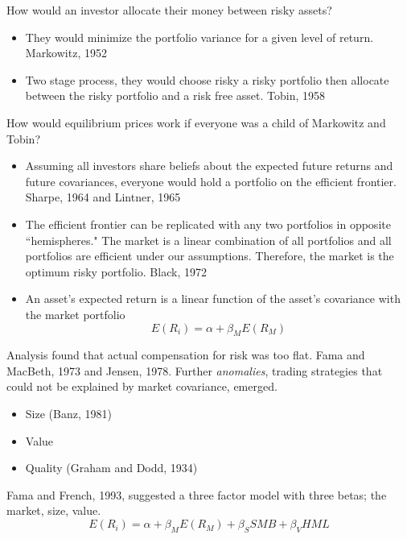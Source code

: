 How would an investor allocate their money between risky assets?
\begin{itemize}
  \item They would minimize the portfolio variance for a given level of return.
  Markowitz, 1952\cite{markowitz1952portfolio}
  \item Two stage process, they would choose risky a risky portfolio then allocate between
  the risky portfolio and a risk free asset. Tobin, 1958\cite{tobin1958liquidity}
\end{itemize}
How would equilibrium prices work if everyone was a child of Markowitz and Tobin?
\begin{itemize}
  \item Assuming all investors share beliefs about the expected future returns and future
  covariances, everyone would hold a portfolio on the efficient frontier.
  Sharpe, 1964\cite{sharpe1964capital} and Lintner, 1965\cite{lintner1965valuation}
  \item The efficient frontier can be replicated with any two portfolios in opposite
  ``hemispheres." The market is a linear combination of all portfolios and all
  portfolios are efficient under our assumptions. Therefore, the market is the optimum
  risky portfolio. Black, 1972\cite{black1972capital}
  \item An asset's expected return is a linear function of the asset's covariance with the
  market portfolio
  \begin{equation}
    E(R_i) = \alpha + \beta_M E(R_M)
  \end{equation}
\end{itemize}

Analysis found that actual compensation for risk was too flat.
Fama and MacBeth, 1973\cite{fama1973risk} and Jensen, 1978\cite{jensen1978some}.
Further \emph{anomalies}, trading strategies that could not be explained by market
covariance, emerged.
\begin{itemize}
  \item Size (Banz, 1981\cite{banz1981relationship})
  \item Value
  \item Quality (Graham and Dodd, 1934\cite{graham1934security})
\end{itemize}

Fama and French, 1993\cite{fama1993common}, suggested a three factor model with three
betas; the market, size, value.
\begin{equation}
  E(R_i) = \alpha + \beta_M E(R_M) + \beta_S SMB + \beta_V HML
\end{equation}

